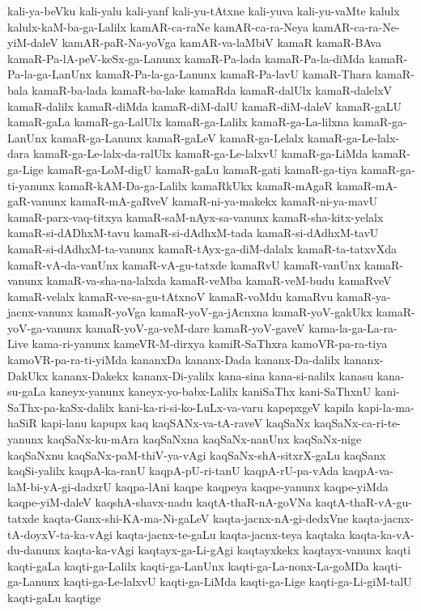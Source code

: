{kali-ya-beVku
kali-yalu
kali-yanf
kali-yu-tAtxne
kali-yuva
kali-yu-vaMte
kalulx
kalulx-kaM-ba-ga-Lalilx
kamAR-ca-raNe
kamAR-ca-ra-Neya
kamAR-ca-ra-Ne-yiM-daleV
kamAR-paR-Na-yoVga
kamAR-va-laMbiV
kamaR
kamaR-BAva
kamaR-Pa-lA-peV-keSx-ga-Lanunx
kamaR-Pa-lada
kamaR-Pa-la-diMda
kamaR-Pa-la-ga-LanUnx
kamaR-Pa-la-ga-Lanunx
kamaR-Pa-lavU
kamaR-Thara
kamaR-bala
kamaR-ba-lada
kamaR-ba-lake
kamaRda
kamaR-dalUlx
kamaR-dalelxV
kamaR-dalilx
kamaR-diMda
kamaR-diM-dalU
kamaR-diM-daleV
kamaR-gaLU
kamaR-gaLa
kamaR-ga-LalUlx
kamaR-ga-Lalilx
kamaR-ga-La-lilxna
kamaR-ga-LanUnx
kamaR-ga-Lanunx
kamaR-gaLeV
kamaR-ga-Lelalx
kamaR-ga-Le-lalx-dara
kamaR-ga-Le-lalx-da-ralUlx
kamaR-ga-Le-lalxvU
kamaR-ga-LiMda
kamaR-ga-Lige
kamaR-ga-LoM-digU
kamaR-gaLu
kamaR-gati
kamaR-ga-tiya
kamaR-ga-ti-yanunx
kamaR-kAM-Da-ga-Lalilx
kamaRkUkx
kamaR-mAgaR
kamaR-mA-gaR-vanunx
kamaR-mA-gaRveV
kamaR-ni-ya-makekx
kamaR-ni-ya-mavU
kamaR-parx-vaq-titxya
kamaR-saM-nAyx-sa-vanunx
kamaR-sha-kitx-yelalx
kamaR-si-dADhxM-tavu
kamaR-si-dAdhxM-tada
kamaR-si-dAdhxM-tavU
kamaR-si-dAdhxM-ta-vanunx
kamaR-tAyx-ga-diM-dalalx
kamaR-ta-tatxvXda
kamaR-vA-da-vanUnx
kamaR-vA-gu-tatxde
kamaRvU
kamaR-vanUnx
kamaR-vanunx
kamaR-va-sha-na-lalxda
kamaR-veMba
kamaR-veM-budu
kamaRveV
kamaR-velalx
kamaR-ve-sa-gu-tAtxnoV
kamaR-voMdu
kamaRvu
kamaR-ya-jacnx-vanunx
kamaR-yoVga
kamaR-yoV-ga-jAcnxna
kamaR-yoV-gakUkx
kamaR-yoV-ga-vanunx
kamaR-yoV-ga-veM-dare
kamaR-yoV-gaveV
kama-la-ga-La-ra-Live
kama-ri-yanunx
kameVR-M-dirxya
kamiR-SaThxra
kamoVR-pa-ra-tiya
kamoVR-pa-ra-ti-yiMda
kananxDa
kananx-Dada
kananx-Da-dalilx
kananx-DakUkx
kananx-Dakekx
kananx-Di-yalilx
kana-sina
kana-si-nalilx
kanasu
kana-su-gaLa
kaneyx-yanunx
kaneyx-yo-babx-Lalilx
kaniSaThx
kani-SaThxnU
kani-SaThx-pa-kaSx-dalilx
kani-ka-ri-si-ko-LuLx-va-varu
kapepxgeV
kapila
kapi-la-ma-haSiR
kapi-lanu
kapupx
kaq
kaqSANx-va-tA-raveV
kaqSaNx
kaqSaNx-ca-ri-te-yanunx
kaqSaNx-ku-mAra
kaqSaNxna
kaqSaNx-nanUnx
kaqSaNx-nige
kaqSaNxnu
kaqSaNx-paM-thiV-ya-vAgi
kaqSaNx-shA-sitxrX-gaLu
kaqSanx
kaqSi-yalilx
kaqpA-ka-ranU
kaqpA-pU-ri-tanU
kaqpA-rU-pa-vAda
kaqpA-va-laM-bi-yA-gi-dadxrU
kaqpa-lAni
kaqpe
kaqpeya
kaqpe-yanunx
kaqpe-yiMda
kaqpe-yiM-daleV
kaqshA-shavx-nadu
kaqtA-thaR-nA-goVNa
kaqtA-thaR-vA-gu-tatxde
kaqta-Ganx-shi-KA-ma-Ni-gaLeV
kaqta-jacnx-nA-gi-dedxVne
kaqta-jacnx-tA-doyxV-ta-ka-vAgi
kaqta-jacnx-te-gaLu
kaqta-jacnx-teya
kaqtaka
kaqta-ka-vA-du-danunx
kaqta-ka-vAgi
kaqtayx-ga-Li-gAgi
kaqtayxkekx
kaqtayx-vanunx
kaqti
kaqti-gaLa
kaqti-ga-Lalilx
kaqti-ga-LanUnx
kaqti-ga-La-nonx-La-goMDa
kaqti-ga-Lanunx
kaqti-ga-Le-lalxvU
kaqti-ga-LiMda
kaqti-ga-Lige
kaqti-ga-Li-giM-talU
kaqti-gaLu
kaqtige
}
